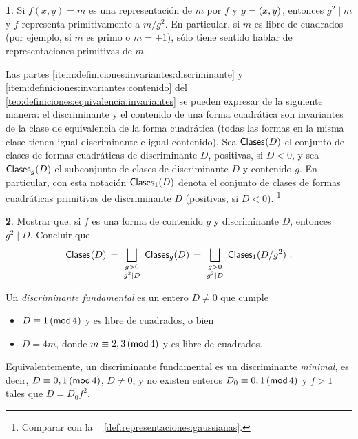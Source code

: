 \theoremstyle{definition}
\newtheorem{ejerDefiniciones}{\ejername}[section]


\begin{ejerDefiniciones}\label{ejer:definiciones:primitivamente}
	Si $f(x,y)=m$ es una representaci\'on de $m$ por $f$ y
	$g=\mcd{x,y}$, entonces $g^2\mid m$ y $f$ representa
	primitivamente a $m/g^2$.
	En particular, si $m$ es libre de cuadrados (por ejemplo,
	si $m$ es primo o $m=\pm 1$), s\'olo tiene sentido hablar
	de representaciones primitivas de $m$.
\end{ejerDefiniciones}

	Las partes \eqref{item:definiciones:invariantes:discriminante}
	y \eqref{item:definiciones:invariantes:contenido} del \teoname~%
	\ref{teo:definiciones:equivalencia:invariantes}
	se pueden expresar de la siguiente manera: el discriminante y
	el contenido de una forma cuadr\'atica son invariantes de la
	clase de equivalencia de la forma cuadr\'atica (todas las formas
	en la misma clase tienen igual discriminante e igual contenido).
	Sea $\varClases(D)$ el conjunto de clases de formas cuadr\'aticas
	de discriminante $D$, positivas, si $D<0$,
	y sea $\varClases[g](D)$ el subconjunto de
	clases de discriminante $D$ y contenido $g$.
	En particular, con esta notaci\'on $\varClases[1](D)$ denota el
	conjunto de clases de formas cuadr\'aticas primitivas de
	discriminante $D$ (positivas, si $D<0$).%
	\footnote{
		Comparar con la ~%
		\ref{def:representaciones:gaussianas}.
	}

\begin{ejerDefiniciones}\label{ejer:definiciones:clases}
	Mostrar que, si $f$ es una forma de contenido $g$ y discriminante
	$D$, entonces $g^2\mid D$. Concluir que
	\begin{displaymath}
		\varClases(D)\,=\,
		\bigsqcup_{\smatrix{g>0 \\ g^2\mid D}}\,\varClases[g](D)
			\,=\,\bigsqcup_{\smatrix{g>0 \\ g^2\mid D}}\,
				\varClases[1](D/g^2)
		\text{ .}
	\end{displaymath}
\end{ejerDefiniciones}

	Un \emph{discriminante fundamental} es un entero $D\neq 0$ que cumple
	\begin{itemize}
		\item $D\equiv 1\tmodulo[4]$ y es libre de cuadrados,
			o bien
		\item $D=4m$, donde $m\equiv 2,3\tmodulo[4]$ y es libre
			de cuadrados.
	\end{itemize}
	Equivalentemente, un discriminante fundamental es un discriminante
	\emph{minimal}, es decir,
	$D\equiv 0,1\tmodulo[4]$, $D\neq 0$, y no existen enteros
	$D_0\equiv 0,1\tmodulo[4]$ y $f>1$ tales que $D=D_0f^2$.

